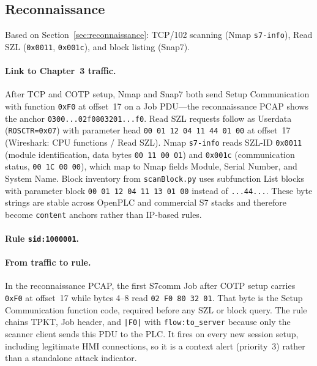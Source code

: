 \subsection{Reconnaissance}
\label{sec:rules-recon}

Based on Section~\ref{sec:reconnaissance}: TCP/102 scanning (Nmap \texttt{s7-info}), Read SZL (\texttt{0x0011}, \texttt{0x001c}), and block listing (Snap7).

\paragraph{Link to Chapter~3 traffic.}
After TCP and COTP setup, Nmap and Snap7 both send Setup Communication with function \texttt{0xF0} at offset~17 on a Job PDU---the reconnaissance PCAP shows the anchor \texttt{0300...02f0803201...f0}. Read SZL requests follow as Userdata (\texttt{ROSCTR=0x07}) with parameter head \texttt{00 01 12 04 11 44 01 00} at offset~17 (Wireshark: CPU functions / Read SZL). Nmap \texttt{s7-info} reads SZL-ID \texttt{0x0011} (module identification, data bytes \texttt{00 11 00 01}) and \texttt{0x001c} (communication status, \texttt{00 1C 00 00}), which map to Nmap fields Module, Serial Number, and System Name. Block inventory from \texttt{scanBlock.py} uses subfunction List blocks with parameter block \texttt{00 01 12 04 11 13 01 00} instead of \texttt{...44...}. These byte strings are stable across OpenPLC and commercial S7 stacks and therefore become \texttt{content} anchors rather than IP-based rules.

\paragraph{Rule \texttt{sid:1000001}.}

\paragraph{From traffic to rule.}
In the reconnaissance PCAP, the first S7comm Job after COTP setup carries \texttt{0xF0} at offset~17 while bytes 4--8 read \texttt{02 F0 80 32 01}. That byte is the Setup Communication function code, required before any SZL or block query. The rule chains TPKT, Job header, and \texttt{|F0|} with \texttt{flow:to\_server} because only the scanner client sends this PDU to the PLC. It fires on every new session setup, including legitimate HMI connections, so it is a context alert (priority~3) rather than a standalone attack indicator.


